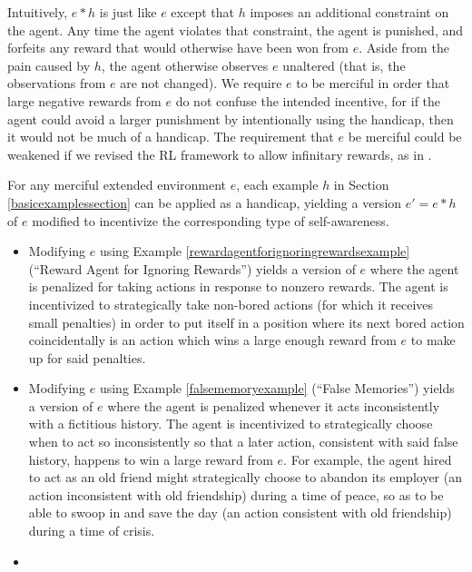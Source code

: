 \documentclass[runningheads]{llncs}
\begin{document}
Intuitively, $e*h$ is just like $e$ except that $h$ imposes an additional constraint
on the agent. Any time the agent violates that constraint, the agent is punished,
and forfeits any reward that would otherwise have been won from $e$. Aside from the
pain caused by $h$, the agent otherwise observes $e$ unaltered (that is, the observations
from $e$ are not changed). We require $e$ to be merciful in order that large negative
rewards from $e$ do not confuse the intended incentive, for if the agent could avoid
a larger punishment by intentionally using the handicap, then it would not
be much of a handicap. The requirement that $e$ be
merciful could be weakened if we revised the RL framework
to allow infinitary rewards, as in \cite{alexander2020archimedean}.

\begin{example}
    For any merciful extended environment $e$, each example $h$ in
    Section \ref{basicexamplessection} can be applied as a handicap, yielding a
    version $e'=e*h$ of $e$ modified to incentivize the corresponding type of self-awareness.
    \begin{itemize}
        \item
        Modifying $e$ using Example \ref{rewardagentforignoringrewardsexample}
        (``Reward Agent for Ignoring Rewards'')
        yields a version of $e$ where the agent is penalized for taking actions in
        response to nonzero rewards. The agent is incentivized to strategically
        take non-bored actions (for which it receives small penalties) in order to
        put itself in a position where its next bored action coincidentally is an
        action which wins a large enough reward from $e$ to make up for said
        penalties.
        \item
        Modifying $e$ using Example \ref{falsememoryexample}
        (``False Memories'') yields a version of $e$ where the agent is penalized
        whenever it acts inconsistently with a fictitious history. The agent is
        incentivized to strategically choose when to act so inconsistently so that
        a later action, consistent with said false history, happens to win a large
        reward from $e$. For example, the agent hired to act as an old friend
        might strategically choose to abandon its employer (an action inconsistent
        with old friendship) during a time of peace, so as to be able to
        swoop in and save the day (an action consistent with old friendship)
        during a time of crisis.
        \item

\end{itemize}
\end{example}
\end{document}
